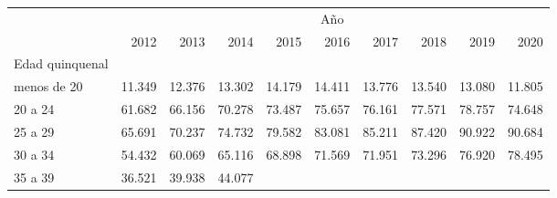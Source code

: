 \begin{tabular}{llllllllll}
\cline{1-10}
\multicolumn{1}{c}{} &
  \multicolumn{9}{|c}{Año} \\
\multicolumn{1}{c}{} &
  \multicolumn{1}{|r}{2012} &
  \multicolumn{1}{r}{2013} &
  \multicolumn{1}{r}{2014} &
  \multicolumn{1}{r}{2015} &
  \multicolumn{1}{r}{2016} &
  \multicolumn{1}{r}{2017} &
  \multicolumn{1}{r}{2018} &
  \multicolumn{1}{r}{2019} &
  \multicolumn{1}{r}{2020} \\
\cline{1-10}
\multicolumn{1}{l}{Edad quinquenal} &
  \multicolumn{1}{|r}{} &
  \multicolumn{1}{r}{} &
  \multicolumn{1}{r}{} &
  \multicolumn{1}{r}{} &
  \multicolumn{1}{r}{} &
  \multicolumn{1}{r}{} &
  \multicolumn{1}{r}{} &
  \multicolumn{1}{r}{} &
  \multicolumn{1}{r}{} \\
\multicolumn{1}{l}{\hspace{1em}menos de 20} &
  \multicolumn{1}{|r}{11.349} &
  \multicolumn{1}{r}{12.376} &
  \multicolumn{1}{r}{13.302} &
  \multicolumn{1}{r}{14.179} &
  \multicolumn{1}{r}{14.411} &
  \multicolumn{1}{r}{13.776} &
  \multicolumn{1}{r}{13.540} &
  \multicolumn{1}{r}{13.080} &
  \multicolumn{1}{r}{11.805} \\
\multicolumn{1}{l}{\hspace{1em}20 a 24} &
  \multicolumn{1}{|r}{61.682} &
  \multicolumn{1}{r}{66.156} &
  \multicolumn{1}{r}{70.278} &
  \multicolumn{1}{r}{73.487} &
  \multicolumn{1}{r}{75.657} &
  \multicolumn{1}{r}{76.161} &
  \multicolumn{1}{r}{77.571} &
  \multicolumn{1}{r}{78.757} &
  \multicolumn{1}{r}{74.648} \\
\multicolumn{1}{l}{\hspace{1em}25 a 29} &
  \multicolumn{1}{|r}{65.691} &
  \multicolumn{1}{r}{70.237} &
  \multicolumn{1}{r}{74.732} &
  \multicolumn{1}{r}{79.582} &
  \multicolumn{1}{r}{83.081} &
  \multicolumn{1}{r}{85.211} &
  \multicolumn{1}{r}{87.420} &
  \multicolumn{1}{r}{90.922} &
  \multicolumn{1}{r}{90.684} \\
\multicolumn{1}{l}{\hspace{1em}30 a 34} &
  \multicolumn{1}{|r}{54.432} &
  \multicolumn{1}{r}{60.069} &
  \multicolumn{1}{r}{65.116} &
  \multicolumn{1}{r}{68.898} &
  \multicolumn{1}{r}{71.569} &
  \multicolumn{1}{r}{71.951} &
  \multicolumn{1}{r}{73.296} &
  \multicolumn{1}{r}{76.920} &
  \multicolumn{1}{r}{78.495} \\
\multicolumn{1}{l}{\hspace{1em}35 a 39} &
  \multicolumn{1}{|r}{36.521} &
  \multicolumn{1}{r}{39.938} &
  \multicolumn{1}{r}{44.077} &

\end{tabular}
